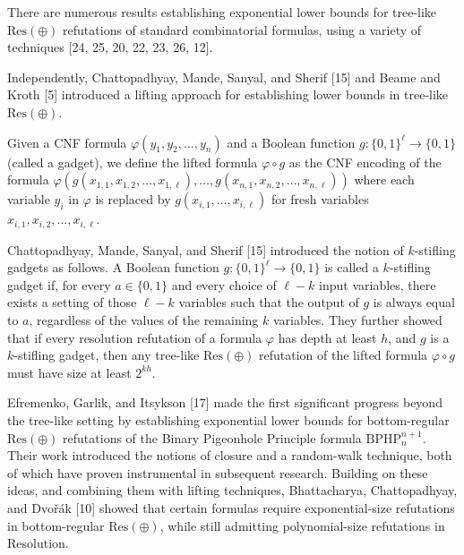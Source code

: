 \documentclass[10pt,a4paper]{article}
\begin{document}
There are numerous results establishing exponential lower bounds for tree-like $\mathrm{Res}(\oplus)$ refutations of
standard combinatorial formulas, using a variety of techniques [24, 25, 20, 22, 23, 26, 12].\par



Independently, Chattopadhyay, Mande, Sanyal, and Sherif [15] and Beame and Kroth [5] introduced
a lifting approach for establishing lower bounds in tree-like $\mathrm{Res}(\oplus)$.\par



Given a CNF formula $\varphi(y_{1},y_{2},\dots,y_{n})$ and a Boolean function
$g:\{0,1\}^{\ell}\to\{0,1\}$ (called a gadget), we define the
lifted formula $\varphi\circ g$ as the CNF encoding of the formula
$\varphi(g(x_{1,1},x_{1,2},\dots,x_{1,\ell}),\dots,g(x_{n,1},x_{n,2},\dots,x_{n,\ell}))$ where each variable $y_{i}$ in $\varphi$ is replaced by
$g(x_{i,1},\dots,x_{i,\ell})$ for fresh variables $x_{i,1},x_{i,2},\dots,x_{i,\ell}$.\par



Chattopadhyay, Mande, Sanyal, and Sherif [15] introduced the notion of
$k$-stifling gadgets as follows.
A Boolean function $g:\{0,1\}^{\ell}\to\{0,1\}$ is called a $k$-stifling gadget
if, for every $a\in\{0,1\}$ and every choice of $\ell-k$ input variables,
there exists a setting of those $\ell-k$ variables such that the output of $g$
is always equal to $a$, regardless of the values of the remaining $k$ variables.
They further showed that if every resolution refutation of a formula $\varphi$ has
depth at least $h$, and $g$ is a $k$-stifling gadget, then any tree-like $\mathrm{Res}(\oplus)$
refutation of the lifted formula $\varphi\circ g$ must have size at least $2^{kh}$.\par



Efremenko, Garlik, and Itsykson [17] made the first significant progress beyond
the tree-like setting by establishing exponential lower bounds for bottom-regular
$\mathrm{Res}(\oplus)$ refutations of the Binary Pigeonhole Principle formula $\mathrm{BPHP}^{n+1}_{n}$.
Their work introduced the notions of closure and a random-walk technique, both of
which have proven instrumental in subsequent research.
Building on these ideas, and combining them with lifting techniques, Bhattacharya, Chattopadhyay,
and Dvořák [10] showed that certain formulas require exponential-size refutations in
bottom-regular $\mathrm{Res}(\oplus)$, while still admitting polynomial-size refutations in
Resolution.\par
\end{document}
